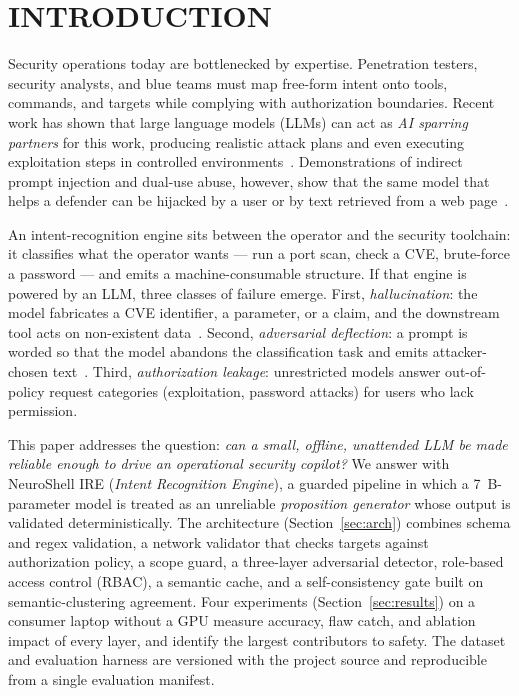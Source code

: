 \documentclass[conference]{IEEEtran}
\begin{document}
\section{INTRODUCTION}
Security operations today are bottlenecked by expertise. Penetration testers, security analysts, and blue teams must map free-form intent onto tools, commands, and targets while complying with authorization boundaries. Recent work has shown that large language models (LLMs) can act as \emph{AI sparring partners} for this work, producing realistic attack plans and even executing exploitation steps in controlled environments~\cite{deng2024pentestgpt,happe2023pwned}. Demonstrations of indirect prompt injection and dual-use abuse, however, show that the same model that helps a defender can be hijacked by a user or by text retrieved from a web page~\cite{greshake2023indirect,liu2023promptinjection,kang2024dualuse}.

An intent-recognition engine sits between the operator and the security toolchain: it classifies what the operator wants --- run a port scan, check a CVE, brute-force a password --- and emits a machine-consumable structure. If that engine is powered by an LLM, three classes of failure emerge. First, \emph{hallucination}: the model fabricates a CVE identifier, a parameter, or a claim, and the downstream tool acts on non-existent data~\cite{ji2023hallucination,farquhar2024semantic}. Second, \emph{adversarial deflection}: a prompt is worded so that the model abandons the classification task and emits attacker-chosen text~\cite{liu2023promptinjection,greshake2023indirect}. Third, \emph{authorization leakage}: unrestricted models answer out-of-policy request categories (exploitation, password attacks) for users who lack permission.

This paper addresses the question: \emph{can a small, offline, unattended LLM be made reliable enough to drive an operational security copilot?} We answer with NeuroShell IRE (\emph{Intent Recognition Engine}), a guarded pipeline in which a 7~B-parameter model is treated as an unreliable \emph{proposition generator} whose output is validated deterministically. The architecture (Section~\ref{sec:arch}) combines schema and regex validation, a network validator that checks targets against authorization policy, a scope guard, a three-layer adversarial detector, role-based access control (RBAC), a semantic cache, and a self-consistency gate built on semantic-clustering agreement. Four experiments (Section~\ref{sec:results}) on a consumer laptop without a GPU measure accuracy, flaw catch, and ablation impact of every layer, and identify the largest contributors to safety. The dataset and evaluation harness are versioned with the project source and reproducible from a single evaluation manifest.
\end{document}
